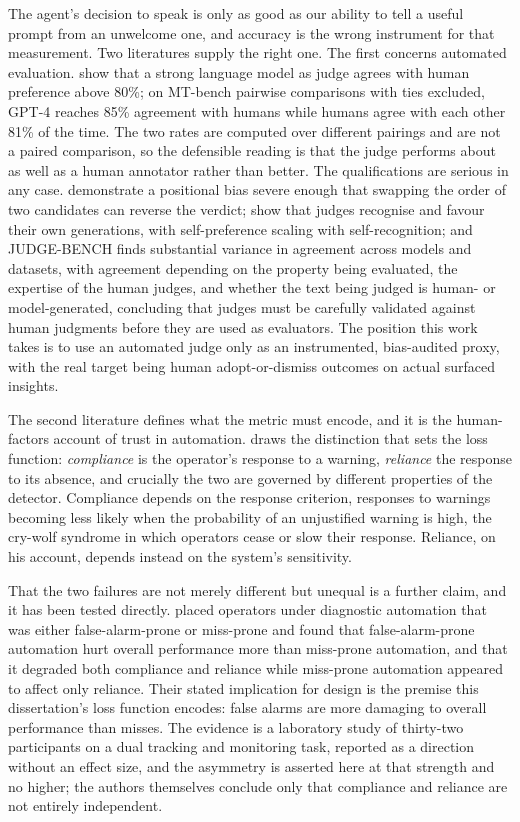 The agent's decision to speak is only as good as our ability to tell a useful
prompt from an unwelcome one, and accuracy is the wrong instrument for that
measurement. Two literatures supply the right one. The first concerns
automated evaluation. \citet{zheng_judging_2023} show that a strong language
model as judge agrees with human preference above 80\%; on MT-bench pairwise
comparisons with ties excluded, GPT-4 reaches 85\% agreement with humans while
humans agree with each other 81\% of the time. The two rates are computed over
different pairings and are not a paired comparison, so the defensible reading is
that the judge performs about as well as a human annotator rather than better.
The qualifications are serious in any case. \citet{wang_large_2024} demonstrate
a positional bias severe enough that swapping the order of two candidates can
reverse the verdict; \citet{panickssery_llm_2024} show that judges recognise
and favour their own generations, with self-preference scaling with
self-recognition; and JUDGE-BENCH \citep{bavaresco_llms_2025} finds substantial
variance in agreement across models and datasets, with agreement depending on
the property being evaluated, the expertise of the human judges, and whether
the text being judged is human- or model-generated, concluding that judges must
be carefully validated against human judgments before they are used as
evaluators. The position this work takes is to use an automated judge only as
an instrumented, bias-audited proxy, with the real target being human
adopt-or-dismiss outcomes on actual surfaced insights.

The second literature defines what the metric must encode, and it is the
human-factors account of trust in automation. \citet{meyer_conceptual_2004}
draws the distinction that sets the loss function: \emph{compliance} is the
operator's response to a warning, \emph{reliance} the response to its absence,
and crucially the two are governed by different properties of the detector.
Compliance depends on the response criterion, responses to warnings becoming
less likely when the probability of an unjustified warning is high, the
cry-wolf syndrome in which operators cease or slow their response. Reliance, on
his account, depends instead on the system's sensitivity.

That the two failures are not merely different but unequal is a further claim,
and it has been tested directly. \citet{dixon_independence_2007} placed
operators under diagnostic automation that was either false-alarm-prone or
miss-prone and found that false-alarm-prone automation hurt overall performance
more than miss-prone automation, and that it degraded both compliance and
reliance while miss-prone automation appeared to affect only reliance. Their
stated implication for design is the premise this dissertation's loss function
encodes: false alarms are more damaging to overall performance than misses. The
evidence is a laboratory study of thirty-two participants on a dual tracking
and monitoring task, reported as a direction without an effect size, and the
asymmetry is asserted here at that strength and no higher; the authors
themselves conclude only that compliance and reliance are not entirely
independent.

